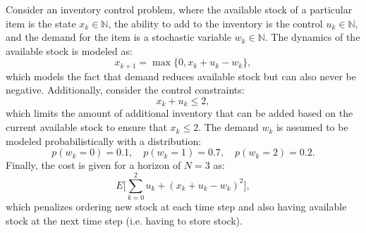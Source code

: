 \begin{example} \label{ex:stoDP}
\theoremstyle{definition}
Consider an inventory control problem, where the available stock of a particular item is the state $x_k \in \mathbb{N}$, the ability to add to the inventory is the control $u_k \in \mathbb{N}$, and the demand for the item is a stochastic variable $w_k \in \mathbb{N}$. The dynamics of the available stock is modeled as:
\begin{equation*}
x_{k+1} = \max \{0, x_k + u_k - w_k\},
\end{equation*}
which models the fact that demand reduces available stock but can also never be negative. Additionally, consider the control constraints:
\begin{equation*}
x_k + u_k \leq 2,
\end{equation*}
which limits the amount of additional inventory that can be added based on the current available stock to ensure that $x_k \leq 2$.
The demand $w_k$ is assumed to be modeled probabilistically with a distribution:
\begin{equation*}
p(w_k=0) = 0.1, \quad p(w_k = 1) = 0.7, \quad p(w_k = 2) = 0.2.
\end{equation*}
Finally, the cost is given for a horizon of $N=3$ as:
\begin{equation*}
E\big[\sum_{k=0}^2 u_k + (x_k + u_k - w_k)^2 \big],
\end{equation*}
which penalizes ordering new stock at each time step and also having available stock at the next time step (i.e. having to store stock).


\end{example}

